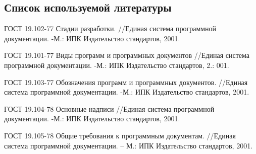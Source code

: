 \subsection*{Список используемой литературы}
\begin{my_enumerate}

\item
ГОСТ 19.102-77 Стадии разработки. //Единая система программной документации. -М.: ИПК Издательство стандартов, 2001. \\

\item
ГОСТ 19.101-77 Виды программ и программных документов
//Единая система программной документации. -М.: ИПК Издательство стандартов, 2.: 001. \\

\item
ГОСТ 19.103-77 Обозначения программ и программных документов. //Единая система программной документации. -М.: ИПК Издательство стандартов, 2001. \\

\item
ГОСТ 19.104-78 Основные надписи //Единая система программной документации. -М.: ИПК Издательство стандартов, 2001. \\

\item 
ГОСТ 19.105-78 Общие требования к программным документам. //Единая система
программной документации. – М.: ИПК Издательство стандартов, 2001. \\

\end{my_enumerate}


